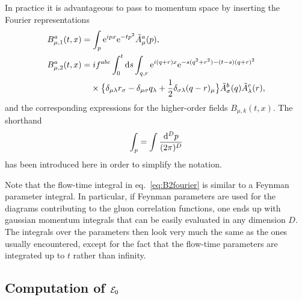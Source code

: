 In practice it is advantageous to pass to momentum space by
inserting the Fourier representations
\begin{align}
  B^a_{\mu,1}(t,x)&=\int_p\rme^{ipx}\rme^{-tp^2}\tilde{A}^a_{\mu}(p),
  \label{eq:B1fourier}\\
  B^a_{\mu,2}(t,x)&=if^{abc}\int_0^t\rmd s\int_{q,r}
  \rme^{i(q+r)x}\rme^{-s(q^2+r^2)-(t-s)(q+r)^2}
  \nonumber\\
  &\hphantom{{}=}\times
  \bigl\{\delta_{\mu\lambda}r_{\sigma}-\delta_{\mu\sigma}q_{\lambda}
  +\frac{1}{2}\delta_{\sigma\lambda}(q-r)_{\mu}\bigr\}
  \tilde{A}_{\sigma}^b(q)\tilde{A}_{\lambda}^c(r),
  \label{eq:B2fourier}
\end{align}
and the corresponding
expressions for the higher-order fields $B_{\mu,k}(t,x)$.
The shorthand
\begin{equation}
  \int_{p}=\int{\mathrm{d}^D p\over(2\pi)^D}
  \label{eq:intp}
\end{equation}
has been introduced here in order to simplify the notation.

Note that the flow-time integral in eq.~\eqref{eq:B2fourier}
is similar to a Feynman parameter integral.
In particular,
if Feynman parameters are used for
the diagrams contributing to the gluon
correlation functions,
one ends up with gaussian momentum integrals
that can be easily evaluated in any dimension $D$.
The integrals over the parameters then look very much
the same as the ones usually encountered,
except for the fact that the flow-time parameters
are integrated up to $t$ rather than infinity.


\subsection{Computation of ${\cal E}_0$}

